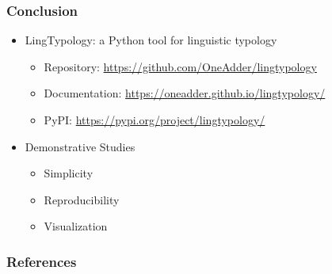 \documentclass{beamer}
\begin{document}
\begin{frame}
\frametitle{Conclusion}
\begin{itemize}
 \item LingTypology: a Python tool for linguistic typology
 \begin{itemize}
  \item Repository: \url{https://github.com/OneAdder/lingtypology}
  \item Documentation: \url{https://oneadder.github.io/lingtypology/}
  \item PyPI: \url{https://pypi.org/project/lingtypology/}
 \end{itemize}
 \item Demonstrative Studies
 \begin{itemize}
  \item Simplicity
  \item Reproducibility
  \item Visualization
 \end{itemize}
\end{itemize}

\end{frame}

\begin{frame}[allowframebreaks]
\frametitle{References}
\renewcommand*{\bibfont}{\tiny}
\printbibliography
\end{frame}
\end{document}
